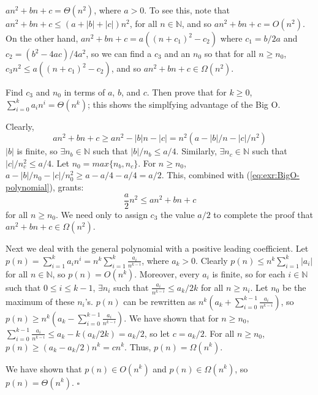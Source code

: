 \documentclass{article}
\newenvironment{prb}[1]
	{\renewcommand\theinner{#1}\inner}
	{\endinner}
\newcommand{\N}{\mathbb{N}}
\newenvironment{solution}
	{\noindent{\bf Solution:}}{\hfill$\square$}
\begin{document}
$an^2+bn+c=\Theta(n^2)$, where $a>0$. To see this, note that 
$an^2+bn+c\leq(a+|b|+|c|)n^2$, for all $n\in\N$, and so 
$an^2+bn+c=O(n^2)$. On the other hand, 
$an^2+bn+c=a((n+c_1)^2-c_2)$ where $c_1=b/2a$ and 
$c_2=(b^2-4ac)/4a^2$, so we can find a $c_3$ and an $n_0$ so that
for all $n\geq n_0$, $c_3n^2\leq a((n+c_1)^2-c_2)$, and so
$an^2+bn+c\in\Omega(n^2)$.

\begin{prb}{1.2}
Find $c_3$ and $n_0$ in terms of $a$, $b$, and $c$. Then prove that
for $k\geq0$, $\sum_{i=0}^ka_in^i=\Theta(n^k)$; this shows the 
simplfying advantage of the Big O.
\end{prb}

\begin{solution}
Clearly, 
\begin{equation}\label{eq:exr:BigO-polynomial1}
an^2+bn+c\ge an^2-|b|n-|c|=n^2(a-|b|/n-|c|/n^2)
\end{equation} 
$|b|$ is finite, so $\exists n_b\in\N$ such that $|b|/n_b\le a/4$.
Similarly, $\exists n_c\in\N$ such that $|c|/n_c^2\le a/4$.
Let $n_0=max\{n_b,n_c\}$. For $n\ge n_0$, 
$a-|b|/n_0-|c|/n_0^2\ge a-a/4-a/4=a/2$. This, combined with
(\ref{eq:exr:BigO-polynomial}),
grants:
$$
\frac{a}{2}n^2\leq an^2+bn+c
$$
for all $n\ge n_0$. We need only to assign $c_3$ the value $a/2$ to complete
the proof that $an^2+bn+c\in\Omega(n^2)$.

Next we deal with the general polynomial with a positive leading coefficient.
Let $p(n)=\sum_{i=1}^ka_in^i=n^k\sum_{i=1}^k\frac{a_i}{n^{k-i}}$, 
where $a_k>0$. Clearly $p(n)\leq n^k\sum_{i=1}^k|a_i|$ for all $n\in\N$,
so $p(n)=O(n^k)$. Moreover, every $a_i$ is finite, so for each $i\in\N$
such that $0\le i\le k-1$, $\exists n_i$ such that 
$\frac{a_i}{n^{k-i}}\le a_k/2k$ for all $n\ge n_i$. Let $n_0$ be the maximum of
these $n_i$'s. $p(n)$ can be rewritten as 
$n^k(a_k+\sum_{i=0}^{k-1}\frac{a_i}{n^{k-i}})$, so 
$p(n)\ge n^k(a_k-\sum_{i=0}^{k-1}\frac{a_i}{n^{k-i}})$.
We have shown that for $n\ge n_0$, 
$\sum_{i=0}^{k-1}\frac{a_i}{n^{k-i}}\le a_k-k(a_k/2k)=a_k/2$, so let $c=a_k/2$.
For all $n\ge n_0$, $p(n)\ge(a_k-a_k/2)n^k=cn^k$. Thus, $p(n)=\Omega(n^k)$.

We have shown that $p(n)\in O(n^k)$ and $p(n)\in\Omega(n^k)$, so 
$p(n)=\Theta(n^k)$. 
\end{solution}
\end{document}
